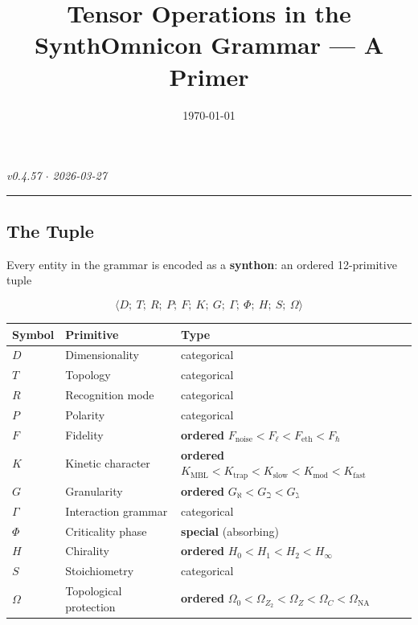 \documentclass[12pt,a4paper]{article}
\begin{document}
\title{Tensor Operations in the SynthOmnicon Grammar --- A Primer}
\date{\today}

\maketitle

\emph{v0.4.57 $\cdot$ 2026-03-27}

\begin{center}
\rule{0.5\textwidth}{0.4pt}
\end{center}

\subsection{The Tuple}

Every entity in the grammar is encoded as a \textbf{synthon}: an ordered 12-primitive tuple

\[\langle D;\ T;\ R;\ P;\ F;\ K;\ G;\ \Gamma;\ \Phi;\ H;\ S;\ \Omega \rangle\]

\begin{table}[htbp]
\centering
\small
{}
\begin{tabularx}{\textwidth}{>{\centering\arraybackslash}X >{\centering\arraybackslash}X >{\centering\arraybackslash}X}
\toprule
\rowcolor{gray!25}\textbf{Symbol} & \textbf{Primitive} & \textbf{Type} \\
\midrule
\rowcolors{1}{white}{gray!10}
$D$ & Dimensionality & categorical \\
$T$ & Topology & categorical \\
$R$ & Recognition mode & categorical \\
$P$ & Polarity & categorical \\
$F$ & Fidelity & \textbf{ordered} $F_\text{noise} < F_{\ell} < F_\text{eth} < F_{\hbar}$ \\
$K$ & Kinetic character & \textbf{ordered} $K_\text{MBL} < K_\text{trap} < K_\text{slow} < K_\text{mod} < K_\text{fast}$ \\
$G$ & Granularity & \textbf{ordered} $G_{\aleph} < G_{\beth} < G_{\gimel}$ \\
$\Gamma$ & Interaction grammar & categorical \\
$\Phi$ & Criticality phase & \textbf{special} (absorbing) \\
$H$ & Chirality & \textbf{ordered} $H_0 < H_1 < H_2 < H_{\infty}$ \\
$S$ & Stoichiometry & categorical \\
$\Omega$ & Topological protection & \textbf{ordered} $\Omega_0 < \Omega_{Z_2} < \Omega_Z < \Omega_C < \Omega_\text{NA}$ \\
\bottomrule
\end{tabularx}
\end{table}
\end{document}
